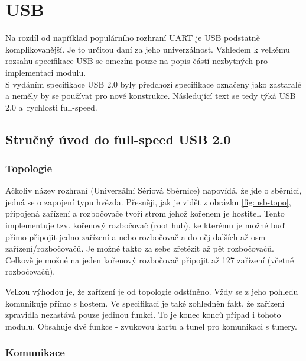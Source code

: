 \section{USB}
\label{sec:USB}

Na rozdíl od například populárního rozhraní UART je USB podstatně komplikovanější. Je to určitou daní za jeho univerzálnost. Vzhledem k velkému rozsahu specifikace USB \cite{usb-spec} se omezím pouze na popis částí nezbytných pro implementaci modulu.\\
S vydáním specifikace USB 2.0 byly předchozí specifikace označeny jako zastaralé a neměly by se používat pro nové konstrukce. Následující text se tedy týká USB 2.0 a~rychlosti full-speed.


\subsection{Stručný úvod do full-speed USB 2.0}
\subsubsection{Topologie}

Ačkoliv název rozhraní (Univerzální Sériová Sběrnice) napovídá, že jde o sběrnici, jedná se o zapojení typu hvězda. Přesněji, jak je vidět z obrázku \ref{fig:usb-topo}, připojená zařízení a rozbočovače tvoří strom jehož kořenem je hostitel. Tento implementuje tzv. kořenový rozbočovač (root hub), ke kterému je možné buď přímo připojit jedno zařízení a nebo rozbočovač a do něj dalších až osm zařízení/rozbočovačů. Je možné takto za sebe zřetězit až pět rozbočovačů. Celkově je možné na jeden kořenový rozbočovač připojit až 127 zařízení (včetně rozbočovačů).

Velkou výhodou je, že zařízení je od topologie odstíněno. Vždy se z jeho pohledu komunikuje přímo s hostem.
Ve specifikaci je také zohledněn fakt, že zařízení zpravidla nezastává pouze jedinou funkci. To je konec konců případ i tohoto modulu. Obsahuje dvě funkce - zvukovou kartu a \iic tunel pro komunikaci s tunery.

\subsubsection{Komunikace}

